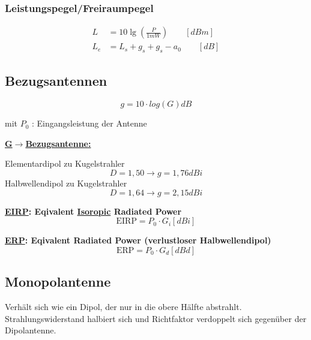 \subsubsection{Leistungspegel/Freiraumpegel}
\begin{align*}
    L      & = 10 \lg \left(\frac{P}{1 \si{mW}}\right) \qquad [\si{dBm}] \\
    L_{e} & = L_{s}+g_{s}+g_{s}-a_{0} \qquad [\si{dB}]
\end{align*}

\subsection{Bezugsantennen}
\[
\boxed{g = 10 \cdot log(G) \si{dB}}
\]

mit $P_0$ : Eingangsleistung der Antenne

\begin{description}
	\item \textbf{\underline{G$\rightarrow$Bezugsantenne:}}
	
	Elementardipol  zu Kugelstrahler \[D = 1,50 \rightarrow g = 1,76\si{dBi}\]
	Halbwellendipol zu Kugelstrahler \[D = 1,64 \rightarrow g = 2,15\si{dBi}\]
	
	\item \textbf{\underline{EIRP}: Eqivalent \underline{Isoropic} Radiated Power}
	\[
	\text{EIRP} = P_0 \cdot G_i [\si{dBi}]
	\]
	
	\item \textbf{\underline{ERP}: Eqivalent Radiated Power (verlustloser Halbwellendipol)}
	\[
	\text{ERP} = P_0 \cdot G_d [\si{dBd}]
	\]
\end{description} 

\subsection{Monopolantenne}
Verhält sich wie ein Dipol, der nur in die obere Hälfte abstrahlt. 	Strahlungswiderstand halbiert sich und Richtfaktor verdoppelt sich gegenüber der Dipolantenne.